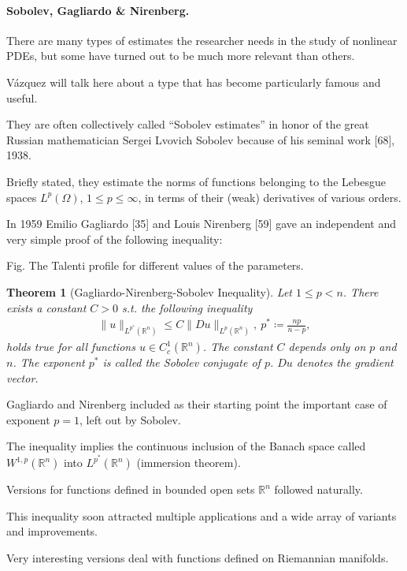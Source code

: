 \documentclass{article}
\newtheorem{theorem}{Theorem}
\begin{document}
\paragraph{Sobolev, Gagliardo \& Nirenberg.} There are many types of estimates the researcher needs in the study of nonlinear PDEs, but some have turned out to be much more relevant than others.

V\'azquez will talk here about a type that has become particularly famous and useful.

They are often collectively called ``Sobolev estimates'' in honor of the great Russian mathematician Sergei Lvovich Sobolev because of his seminal work [68], 1938.

Briefly stated, they estimate the norms of functions belonging to the Lebesgue spaces $L^p(\Omega)$, $1\le p\le\infty$, in terms of their (weak) derivatives of various orders.

In 1959 Emilio Gagliardo [35] and Louis Nirenberg [59] gave an independent and very simple proof of the following inequality:

\textsf{Fig. The Talenti profile for different values of the parameters.}

\begin{theorem}[Gagliardo-Nirenberg-Sobolev Inequality]
	Let $1\le p < n$. There exists a constant $C > 0$ s.t. the following inequality
	\begin{align*}
		\|u\|_{L^{p^*}(\mathbb{R}^n)}\le C\|Du\|_{L^p(\mathbb{R}^n)},\ p^*\coloneqq\frac{np}{n - p},
	\end{align*}
	holds true for all functions $u\in C_c^1(\mathbb{R}^n)$. The constant $C$ depends only on $p$ and $n$. The exponent $p^*$ is called the \emph{Sobolev conjugate} of $p$. $Du$ denotes the gradient vector.
\end{theorem}
Gagliardo and Nirenberg included as their starting point the important case of exponent $p = 1$, left out by Sobolev.

The inequality implies the continuous inclusion of the Banach space called $W^{1,p}(\mathbb{R}^n)$ into $L^{p^*}(\mathbb{R}^n)$ (immersion theorem).

Versions for functions defined in bounded open sets $\mathbb{R}^n$ followed naturally.

This inequality soon attracted multiple applications and a wide array of variants and improvements.

Very interesting versions deal with functions defined on Riemannian manifolds.
\end{document}

